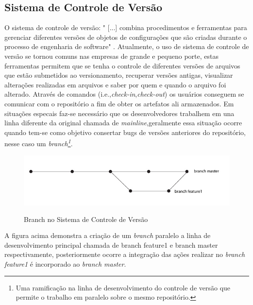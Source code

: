\subsection{Sistema de Controle de Versão}
O sistema de controle de versão: "	[...] combina procedimentos e ferramentas para gerenciar diferentes versões de objetos de configurações que são criadas durante o processo de engenharia de software" .
Atualmente, o uso de sistema de controle de versão se tornou comuns nas empresas de grande e pequeno porte, estas ferramentas permitem que se tenha o controle de diferentes versões de arquivos que estão submetidos ao versionamento, recuperar versões antigas, visualizar alterações realizadas em arquivos e saber por quem e quando o arquivo foi alterado. Através de comandos (i.e.,\textit{check-in},\textit{check-out}) os usuários conseguem se comunicar com o repositório a fim de obter os artefatos ali armazenados. \cite{gleiph2011} Em situações especais faz-se necessário que os desenvolvedores trabalhem em una linha diferente da original chamada de \textit{mainline},geralmente essa situação ocorre quando tem-se como objetivo consertar bugs de versões anteriores do repositório, nesse caso um \textit{branch\footnote{Uma ramificação na linha de desenvolvimento do controle de versão que permite o trabalho em paralelo sobre o mesmo repositório.}}.
\begin{figure}[tbh]
\centering
\caption[Branch no Sistema de Controle de Versão]{Branch no Sistema de Controle de Versão}
\includegraphics[width=0.7\linewidth]{./images/branch}
\label{fig:Branch}
\end{figure}
A figura acima demonstra a criação de um \textit{branch} paralelo a linha de desenvolvimento principal chamada de branch feature1 e branch master respectivamente, posteriormente ocorre a integração das ações realizar no \textit{branch feature1} é incorporado ao \textit{branch master}.
